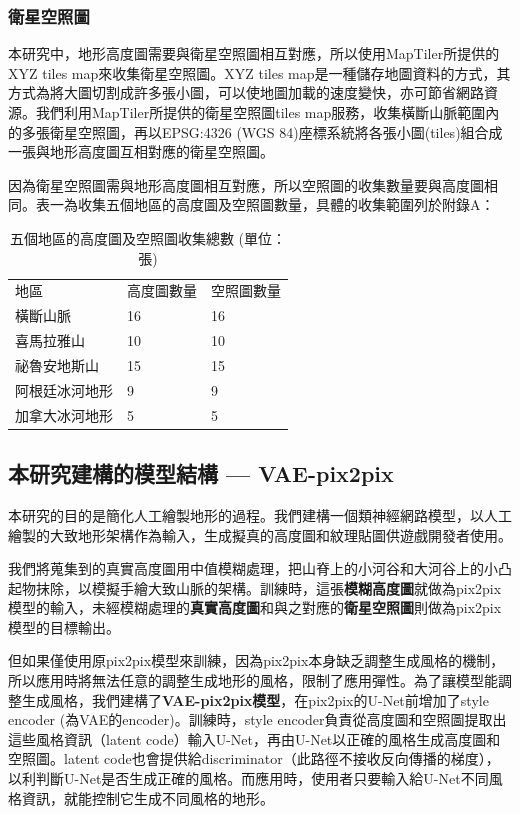 \documentclass[a4paper, 12pt]{article}
\begin{document}
\subsubsection{衛星空照圖}
本研究中，地形高度圖需要與衛星空照圖相互對應，所以使用MapTiler所提供的XYZ tiles map來收集衛星空照圖。XYZ tiles map是一種儲存地圖資料的方式，其方式為將大圖切割成許多張小圖，可以使地圖加載的速度變快，亦可節省網路資源。我們利用MapTiler所提供的衛星空照圖tiles map服務，收集橫斷山脈範圍內的多張衛星空照圖，再以EPSG:4326 (WGS 84)座標系統將各張小圖(tiles)組合成一張與地形高度圖互相對應的衛星空照圖。

因為衛星空照圖需與地形高度圖相互對應，所以空照圖的收集數量要與高度圖相同。表一為收集五個地區的高度圖及空照圖數量，具體的收集範圍列於附錄A：

\begin{table}[htbp]
    \centering
    \caption{五個地區的高度圖及空照圖收集總數 (單位：張)}
    \begin{tabularx}{\linewidth}{|Y|Y|Y|}
        \hline
        地區           & 高度圖數量 & 空照圖數量 \\ \hhline{|=|=|=|}
        橫斷山脈       & 16         & 16         \\ \hline
        喜馬拉雅山     & 10         & 10         \\ \hline
        祕魯安地斯山   & 15         & 15         \\ \hline
        阿根廷冰河地形 & 9          & 9          \\ \hline
        加拿大冰河地形 & 5          & 5          \\ \hline
    \end{tabularx}
    \label{tab:2}
\end{table}

\subsection{本研究建構的模型結構 — VAE-pix2pix}
本研究的目的是簡化人工繪製地形的過程。我們建構一個類神經網路模型，以人工繪製的大致地形架構作為輸入，生成擬真的高度圖和紋理貼圖供遊戲開發者使用。

我們將蒐集到的真實高度圖用中值模糊處理，把山脊上的小河谷和大河谷上的小凸起物抹除，以模擬手繪大致山脈的架構。訓練時，這張\textbf{模糊高度圖}就做為pix2pix模型的輸入，未經模糊處理的\textbf{真實高度圖}和與之對應的\textbf{衛星空照圖}則做為pix2pix模型的目標輸出。

但如果僅使用原pix2pix模型來訓練，因為pix2pix本身缺乏調整生成風格的機制，所以應用時將無法任意的調整生成地形的風格，限制了應用彈性。為了讓模型能調整生成風格，我們建構了\textbf{VAE-pix2pix模型}，在pix2pix的U-Net前增加了style encoder (為VAE的encoder)。訓練時，style encoder負責從高度圖和空照圖提取出這些風格資訊（latent code）輸入U-Net，再由U-Net以正確的風格生成高度圖和空照圖。latent code也會提供給discriminator（此路徑不接收反向傳播的梯度），以利判斷U-Net是否生成正確的風格。而應用時，使用者只要輸入給U-Net不同風格資訊，就能控制它生成不同風格的地形。
\end{document}
